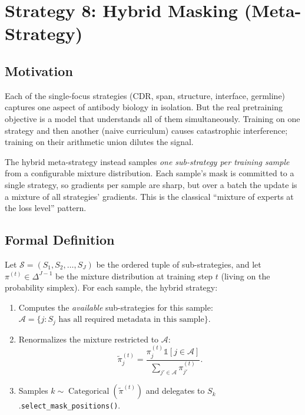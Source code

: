 \documentclass[11pt]{article}
\newcommand{\Ind}{\mathbb{1}}
\DeclareMathOperator{\Cat}{Categorical}
\begin{document}
\section{Strategy 8: Hybrid Masking (Meta-Strategy)}

\subsection{Motivation}
Each of the single-focus strategies (CDR, span, structure, interface,
germline) captures one aspect of antibody biology in isolation. But
the real pretraining objective is a model that understands all of
them simultaneously. Training on one strategy and then another
(naive curriculum) causes catastrophic interference; training on their
arithmetic union dilutes the signal.

The hybrid meta-strategy instead samples \emph{one sub-strategy per
training sample} from a configurable mixture distribution. Each
sample's mask is committed to a single strategy, so gradients per
sample are sharp, but over a batch the update is a mixture of all
strategies' gradients. This is the classical ``mixture of experts at
the loss level'' pattern.

\subsection{Formal Definition}
Let $\mathcal{S} = (S_1, S_2, \ldots, S_J)$ be the ordered tuple of
sub-strategies, and let $\pi^{(t)} \in \Delta^{J-1}$ be the mixture
distribution at training step $t$ (living on the probability simplex).
For each sample, the hybrid strategy:
\begin{enumerate}
\item Computes the \emph{available} sub-strategies for this sample:
$\mathcal{A} = \{j : S_j\text{ has all required metadata in this sample}\}$.
\item Renormalizes the mixture restricted to $\mathcal{A}$:
\begin{equation}
\tilde{\pi}^{(t)}_j = \frac{\pi^{(t)}_j \Ind[j \in \mathcal{A}]}{\sum_{j' \in \mathcal{A}} \pi^{(t)}_{j'}}.
\end{equation}
\item Samples $k \sim \Cat(\tilde{\pi}^{(t)})$ and delegates to
$S_k$.\texttt{select\_mask\_positions()}.
\end{enumerate}
\end{document}
